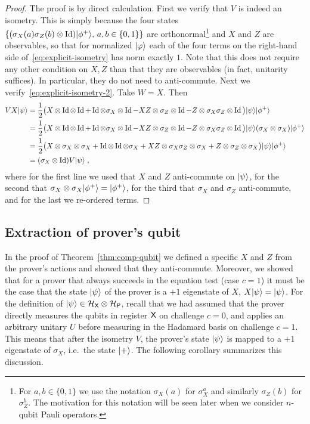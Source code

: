 \begin{proof}
The proof is by direct calculation. First we verify that $V$ is indeed an isometry. This is simply because the four states $\{(\sigma_X(a)\sigma_Z(b) \otimes \mathop{\rm Id}\nolimits)|\phi^+\rangle,\, a,b\in\{0,1\}\}$ are orthonormal\footnote{For $a,b\in\{0,1\}$ we use the notation $\sigma_X(a)$ for $\sigma_X^a$ and similarly $\sigma_Z(b)$ for $\sigma_Z^b$. The motivation for this notation will be seen later when we consider $n$-qubit Pauli operators.} and $X$ and $Z$ are observables, so that for normalized $|\varphi\rangle$ each of the four terms on the right-hand side of~\eqref{eq:explicit-isometry} has norm exactly $1$. Note that this does not require any other condition on $X,Z$ than that they are observables (in fact, unitarity suffices). In particular, they do not need to anti-commute. Next we verify~\eqref{eq:explicit-isometry-2}. 
Take $W=X$. Then
\begin{align*}
 VX |\psi\rangle &= \frac{1}{2}\big(X \otimes \mathop{\rm Id}\nolimits\otimes \mathop{\rm Id}\nolimits + \mathop{\rm Id}\nolimits \otimes \sigma_X \otimes \mathop{\rm Id}\nolimits -XZ \otimes \sigma_Z \otimes \mathop{\rm Id}\nolimits -Z \otimes \sigma_X\sigma_Z \otimes \mathop{\rm Id}\nolimits\big) |\psi\rangle |\phi^+\rangle \\
&= \frac{1}{2}\big(X \otimes \mathop{\rm Id}\nolimits\otimes \mathop{\rm Id}\nolimits + \mathop{\rm Id}\nolimits \otimes \sigma_X \otimes \mathop{\rm Id}\nolimits -XZ \otimes \sigma_Z \otimes \mathop{\rm Id}\nolimits -Z \otimes \sigma_X\sigma_Z \otimes \mathop{\rm Id}\nolimits\big) |\psi\rangle (\sigma_X \otimes \sigma_X)|\phi^+\rangle \\
&= \frac{1}{2}\big(X \otimes \sigma_X \otimes \sigma_X + \mathop{\rm Id}\nolimits \otimes \mathop{\rm Id}\nolimits \otimes\sigma_X +XZ \otimes \sigma_X \sigma_Z \otimes \sigma_X +Z \otimes \sigma_Z \otimes \sigma_X\big) |\psi\rangle |\phi^+\rangle \\
&= (\sigma_X \otimes \mathop{\rm Id}\nolimits) V |\psi\rangle\;,
\end{align*}
where for the first line we used that $X$ and $Z$ anti-commute on $|\psi\rangle$, for the second that $\sigma_X\otimes \sigma_X |\phi^+\rangle = |\phi^+\rangle$, for the third that $\sigma_X$ and $\sigma_Z$ anti-commute, and for the last we re-ordered terms. 
\end{proof} 

\subsection{Extraction of prover's qubit}
\label{sec:extract-simple}

In the proof of Theorem~\ref{thm:comp-qubit} we defined a specific $X$ and $Z$ from the prover's actions and showed that they anti-commute. Moreover, we showed that for a prover that always succeeds in the equation test (case $c=1$) it must be the case that the state $|\psi\rangle$ of the prover is a $+1$ eigenstate of $X$, $X|\psi\rangle=|\psi\rangle$. For the definition of $|\psi\rangle\in\mathcal{H}_{\textsf{X}}\otimes \mathcal{H}_{\textsf{P}}$, recall that we had assumed that the prover directly measures the qubits in register ${\textsf{X}}$ on challenge $c=0$, and applies an arbitrary unitary $U$ before measuring in the Hadamard basis on challenge $c=1$. This means that after the isometry $V$, the prover's state $|\psi\rangle$ is mapped to a $+1$ eigenstate of $\sigma_X$, i.e.\ the state $|+\rangle$. The following corollary summarizes this discussion. 

